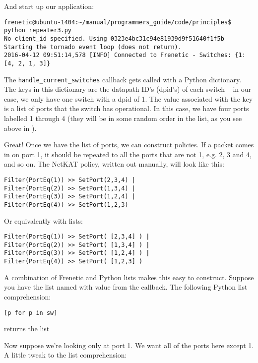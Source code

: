 And start up our application:

\begin{verbatim}
frenetic@ubuntu-1404:~/manual/programmers_guide/code/principles$ python repeater3.py
No client_id specified. Using 0323e4bc31c94e81939d9f51640f1f5b
Starting the tornado event loop (does not return).
2016-04-12 09:51:14,578 [INFO] Connected to Frenetic - Switches: {1: [4, 2, 1, 3]}
\end{verbatim}

The \texttt{handle\_current\_switches} callback gets called with a Python dictionary.  
The keys in this dictionary are the datapath ID's (dpid's) of each switch -- in our case, we only have
one switch with a dpid of 1.
The value associated with the key is a list of ports that the switch has operational.  
In this case, we have four ports labelled 1 through 4 (they will be in some random order in the list, as
you see above in \python{[4, 2, 1, 3]}).

Great!  Once we have the list of ports, we can construct policies.  If a packet comes in on port
1, it should be repeated to all the ports that are not 1, e.g. 2, 3 and 4, and so on.   
The NetKAT policy, written out manually, will look like this:

\begin{verbatim}
Filter(PortEq(1)) >> SetPort(2,3,4) |
Filter(PortEq(2)) >> SetPort(1,3,4) |
Filter(PortEq(3)) >> SetPort(1,2,4) |
Filter(PortEq(4)) >> SetPort(1,2,3)
\end{verbatim}

Or equivalently with lists:

\begin{verbatim}
Filter(PortEq(1)) >> SetPort( [2,3,4] ) |
Filter(PortEq(2)) >> SetPort( [1,3,4] ) |
Filter(PortEq(3)) >> SetPort( [1,2,4] ) |
Filter(PortEq(4)) >> SetPort( [1,2,3] )
\end{verbatim}

A combination of Frenetic and Python lists makes this easy to construct.  
Suppose you have the list named  with value 
\python{[1, 2, 3, 4]} from the callback.   The following Python list comprehension:

\begin{verbatim}
[p for p in sw]
\end{verbatim}

returns the list \python{[1,2,3,4]}

Now suppose we're looking only at port 1.  We want all of the ports here 
except 1.  A little tweak to the list comprehension:

